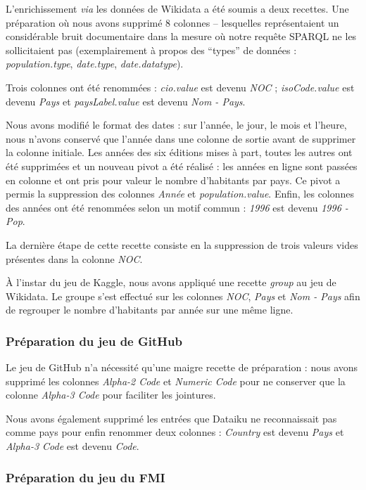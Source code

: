 \documentclass[hidelinks, 12pt]{article}
\begin{document}
L'enrichissement \emph{via} les données de Wikidata a été soumis a deux recettes. Une préparation où nous avons supprimé 8 colonnes -- lesquelles représentaient un considérable bruit documentaire dans la mesure où notre requête SPARQL ne les sollicitaient pas (exemplairement à propos des \enquote{types} de données : \emph{population.type}, \emph{date.type}, \emph{date.datatype}). 

Trois colonnes ont été renommées : \emph{cio.value} est devenu \emph{NOC} ; \emph{isoCode.value} est devenu \emph{Pays} et \emph{paysLabel.value} est devenu \emph{Nom - Pays}.

Nous avons modifié le format des dates : sur l'année, le jour, le mois et l'heure, nous n'avons conservé que l'année dans une colonne de sortie avant de supprimer la colonne initiale. Les années des six éditions mises à part, toutes les autres ont été supprimées et un nouveau pivot a été réalisé : les années en ligne sont passées en colonne et ont pris pour valeur le nombre d'habitants par pays. Ce pivot a permis la suppression des colonnes \emph{Année} et \emph{population.value}. Enfin, les colonnes des années ont été renommées selon un motif commun : \emph{1996} est devenu \emph{1996 - Pop}.

La dernière étape de cette recette consiste en la suppression de trois valeurs vides présentes dans la colonne \emph{NOC}.

À l'instar du jeu de Kaggle, nous avons appliqué une recette \emph{group} au jeu de Wikidata. Le groupe s'est effectué sur les colonnes \emph{NOC}, \emph{Pays} et \emph{Nom - Pays} afin de regrouper le nombre d'habitants par année sur une même ligne.

\subsubsection{Préparation du jeu de GitHub}

Le jeu de GitHub n'a nécessité qu'une maigre recette de préparation : nous avons supprimé les colonnes \emph{Alpha-2 Code} et \emph{Numeric Code} pour ne conserver que la colonne \emph{Alpha-3 Code} pour faciliter les jointures.

Nous avons également supprimé les entrées que Dataiku ne reconnaissait pas comme pays pour enfin renommer deux colonnes : \emph{Country} est devenu \emph{Pays} et \emph{Alpha-3 Code} est devenu \emph{Code}.

\subsubsection{Préparation du jeu du FMI}
\end{document}
